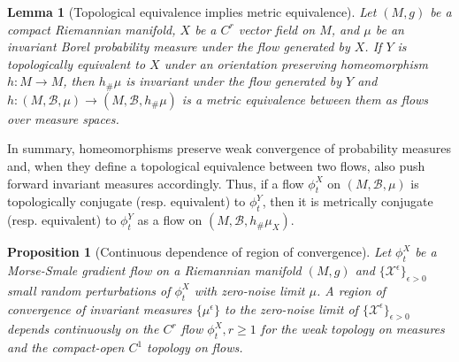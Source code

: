\documentclass[12pt]{article}
\newtheorem{lemma}[theorem]{Lemma}
\newtheorem{proposition}[theorem]{Proposition}
\begin{document}
\begin{lemma}[Topological equivalence implies metric equivalence]
\label{lemma:metric-equivalence-Morse-Smale}
Let $(M,g)$ be a compact Riemannian manifold, $X$ be a $C^r$ vector field on $M$, and $\mu$ be an invariant Borel probability measure under the flow generated by $X$. If $Y$ is topologically equivalent to $X$ under an orientation preserving homeomorphism $h:M \rightarrow M$, then $h_{\#}\mu$ is invariant under the flow generated by $Y$ and $h: (M, \mathcal{B}, \mu) \rightarrow (M, \mathcal{B}, h_{\#}\mu)$ is a metric equivalence between them as flows over measure spaces. 
\end{lemma}

In summary, homeomorphisms preserve weak convergence of probability measures and, when they define a topological equivalence between two flows, also push forward invariant measures accordingly. Thus, if a flow $\phi_t^X$ on $(M, \mathcal{B}, \mu)$ is topologically conjugate (resp. equivalent) to $\phi_t^Y$, then it is metrically conjugate (resp. equivalent) to $\phi_t^Y$ as a flow on $(M, \mathcal{B}, h_{\#}\mu_X)$.

\begin{proposition}[Continuous dependence of region of convergence]
\label{proposition:triangle-commutativity-zero-noise}
    Let $\phi^X_t$ be a Morse-Smale gradient flow on a Riemannian manifold $(M,g)$ and $\{\mathcal{X}^{\epsilon}\}_{\epsilon>0}$ small random perturbations of $\phi^X_t$ with zero-noise limit $\mu$. A region of convergence of invariant measures $\{\mu^{\epsilon}\}$ to the zero-noise limit of $\{\mathcal{X}^{\epsilon}\}_{\epsilon>0}$ depends continuously on the $C^r$ flow $\phi^X_t, r\geq1$ for the weak topology on measures and the compact-open $C^1$ topology on flows.
\end{proposition}
\end{document}
